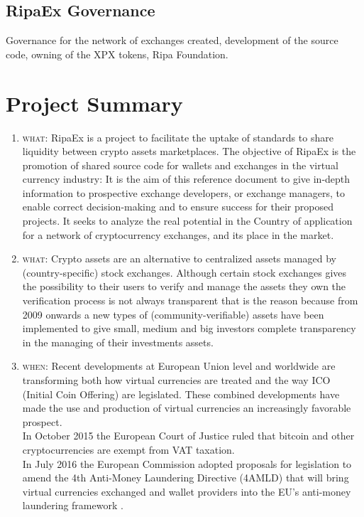 \documentclass[11pt,fleqn,oneside]{book} %
\begin{document}
\subsection{RipaEx Governance}
Governance for the network of exchanges created, development of the source code, owning of the XPX tokens, Ripa Foundation.

\section{Project Summary}
\begin{enumerate}
	\item \textsc{what}: RipaEx is a project to facilitate the uptake of standards to share liquidity between crypto assets marketplaces. 
	The objective of RipaEx is the promotion of shared source code for wallets and exchanges in the virtual currency industry: 
	It is the aim of this reference document to give in-depth information to prospective exchange developers,
	or exchange managers, to enable correct decision-making and to ensure success for their proposed projects. 
	It seeks to analyze the real potential in the Country of application for a network of cryptocurrency exchanges, 
	and its place in the market.
	\item \textsc{what}: Crypto assets are an alternative to centralized assets managed by (country-specific) stock exchanges. Although certain
	stock exchanges gives the possibility to their users to verify and manage the assets they own the verification process
	is not always transparent that is the reason because from 2009 \cite{bitcoin} onwards a new types of (community-verifiable) assets 
	have been implemented to give small, medium and big investors complete transparency in the managing of their investments
	assets.
	\item \textsc{when}: Recent developments at European Union level and worldwide are transforming both how virtual currencies
	are treated and the way ICO (Initial Coin Offering) are legislated. These combined developments 
	have made the use and production of virtual currencies an increasingly favorable prospect. \\
	In October 2015 the European Court of Justice ruled that bitcoin and other cryptocurrencies are exempt from VAT taxation. \\
	In July 2016 the European Commission adopted proposals for legislation to amend the 4th Anti-Money Laundering Directive (4AMLD) that
	will bring virtual currencies exchanged and wallet providers into the EU's anti-money laundering framework \cite{EUAMLCrypto}.\\

\end{enumerate}
\end{document}

